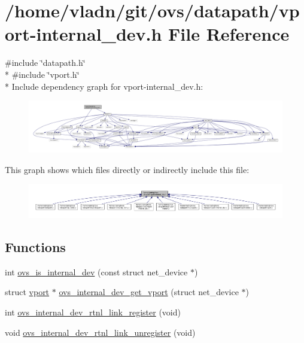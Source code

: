 \hypertarget{vport-internal__dev_8h}{}\section{/home/vladn/git/ovs/datapath/vport-\/internal\+\_\+dev.h File Reference}
\label{vport-internal__dev_8h}
{\ttfamily \#include \char`\"{}datapath.\+h\char`\"{}}\\*
{\ttfamily \#include \char`\"{}vport.\+h\char`\"{}}\\*
Include dependency graph for vport-\/internal\+\_\+dev.h\+:
\nopagebreak
\begin{figure}[H]
\begin{center}
\leavevmode
\includegraphics[width=350pt]{vport-internal__dev_8h__incl}
\end{center}
\end{figure}
This graph shows which files directly or indirectly include this file\+:
\nopagebreak
\begin{figure}[H]
\begin{center}
\leavevmode
\includegraphics[width=350pt]{vport-internal__dev_8h__dep__incl}
\end{center}
\end{figure}
\subsection*{Functions}
\begin{DoxyCompactItemize}
\item 
int \hyperlink{vport-internal__dev_8h_a1e2d48f523e7c77e182e08fb05d7ef30}{ovs\+\_\+is\+\_\+internal\+\_\+dev} (const struct net\+\_\+device $\ast$)
\item 
struct \hyperlink{structvport}{vport} $\ast$ \hyperlink{vport-internal__dev_8h_a0babd16c94fbb92aecdf8a9ec8a1a380}{ovs\+\_\+internal\+\_\+dev\+\_\+get\+\_\+vport} (struct net\+\_\+device $\ast$)
\item 
int \hyperlink{vport-internal__dev_8h_ac6d8a2dd3cdef9e9ba9efdd4e0656f7c}{ovs\+\_\+internal\+\_\+dev\+\_\+rtnl\+\_\+link\+\_\+register} (void)
\item 
void \hyperlink{vport-internal__dev_8h_a4e61a8459847af3c4f5773e09552cf98}{ovs\+\_\+internal\+\_\+dev\+\_\+rtnl\+\_\+link\+\_\+unregister} (void)
\end{DoxyCompactItemize}


